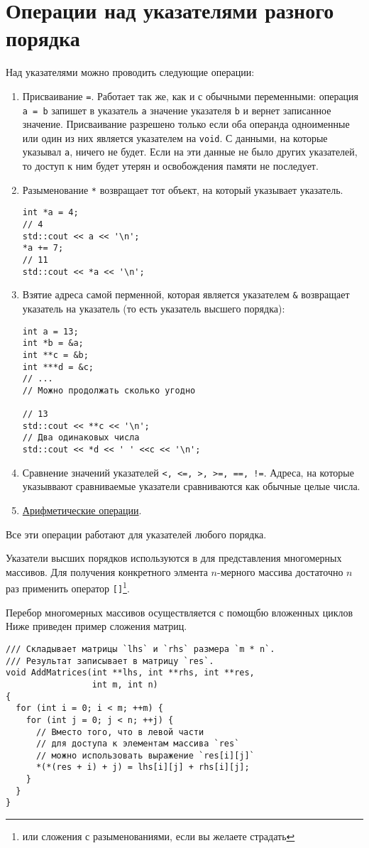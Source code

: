 \section{Операции над указателями разного порядка}
Над указателями можно проводить следующие операции:
\begin{enumerate}
  \item Присваивание \verb|=|. Работает так же, как и с обычными переменными:
  операция \verb|a = b| запишет в указатель \verb|a| значение указателя \verb|b|
  и вернет записанное значение. Присваивание разрешено только если оба операнда одноименные
  или один из них является указателем на \verb|void|. С данными, на которые указывал \verb|a|,
  ничего не будет. Если на эти данные не было других указателей, то доступ к ним будет
  утерян и освобождения памяти не последует.
  \item Разыменование \verb|*| возвращает тот объект, на который указывает указатель.
\begin{verbatim}
int *a = 4;
// 4
std::cout << a << '\n';
*a += 7;
// 11
std::cout << *a << '\n';
\end{verbatim}
  \item Взятие адреса самой перменной, которая является указателем \verb|&| возвращает указатель
  на указатель (то есть указатель высшего порядка):
\begin{verbatim}
int a = 13;
int *b = &a;
int **c = &b;
int ***d = &c;
// ...
// Можно продолжать сколько угодно

// 13
std::cout << **c << '\n';
// Два одинаковых числа
std::cout << *d << ' ' <<c << '\n';
\end{verbatim}
  \item Сравнение значений указателей \verb|<, <=, >, >=, ==, !=|. Адреса, на которые
  указыввают сравниваемые указатели сравниваются как обычные целые числа.
  \item \hyperref[sec:ptr_arithm]{Арифметические операции}.
\end{enumerate}

Все эти операции работают для указателей любого порядка.

Указатели высших порядков используются в для представления многомерных
массивов. Для получения конкретного элмента $n$-мерного массива достаточно $n$ раз
применить оператор \verb|[]|\footnote{или сложения с разыменованиями, если вы желаете страдать}.

Перебор многомерных массивов осуществляется с помощбю вложенных циклов
Ниже приведен пример сложения матриц.
\begin{verbatim}
/// Складывает матрицы `lhs` и `rhs` размера `m * n`.
/// Результат записывает в матрицу `res`.
void AddMatrices(int **lhs, int **rhs, int **res,
                 int m, int n)
{
  for (int i = 0; i < m; ++m) {
    for (int j = 0; j < n; ++j) {
      // Вместо того, что в левой части
      // для доступа к элементам массива `res`
      // можно использовать выражение `res[i][j]`
      *(*(res + i) + j) = lhs[i][j] + rhs[i][j];
    }
  }
}
\end{verbatim}

